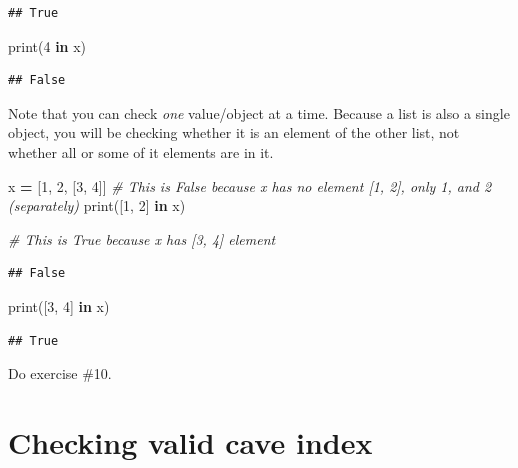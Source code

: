 \documentclass[
]{book}
\newenvironment{Shaded}{\begin{snugshade}}{\end{snugshade}}
\newcommand{\BuiltInTok}[1]{#1}
\newcommand{\CommentTok}[1]{\textcolor[rgb]{0.56,0.35,0.01}{\textit{#1}}}
\newcommand{\DecValTok}[1]{\textcolor[rgb]{0.00,0.00,0.81}{#1}}
\newcommand{\KeywordTok}[1]{\textcolor[rgb]{0.13,0.29,0.53}{\textbf{#1}}}
\newcommand{\NormalTok}[1]{#1}
\newcommand{\OperatorTok}[1]{\textcolor[rgb]{0.81,0.36,0.00}{\textbf{#1}}}
\begin{document}
\begin{verbatim}
## True
\end{verbatim}

\begin{Shaded}
\begin{Highlighting}[]
\BuiltInTok{print}\NormalTok{(}\DecValTok{4} \KeywordTok{in}\NormalTok{ x)}
\end{Highlighting}
\end{Shaded}

\begin{verbatim}
## False
\end{verbatim}

Note that you can check \emph{one} value/object at a time. Because a list is also a single object, you will be checking whether it is an element of the other list, not whether all or some of it elements are in it.

\begin{Shaded}
\begin{Highlighting}[]
\NormalTok{x }\OperatorTok{=}\NormalTok{ [}\DecValTok{1}\NormalTok{, }\DecValTok{2}\NormalTok{, [}\DecValTok{3}\NormalTok{, }\DecValTok{4}\NormalTok{]]}
\CommentTok{\# This is False because x has no element [1, 2], only 1, and 2 (separately)}
\BuiltInTok{print}\NormalTok{([}\DecValTok{1}\NormalTok{, }\DecValTok{2}\NormalTok{] }\KeywordTok{in}\NormalTok{ x)}

\CommentTok{\# This is True because x has [3, 4] element}
\end{Highlighting}
\end{Shaded}

\begin{verbatim}
## False
\end{verbatim}

\begin{Shaded}
\begin{Highlighting}[]
\BuiltInTok{print}\NormalTok{([}\DecValTok{3}\NormalTok{, }\DecValTok{4}\NormalTok{] }\KeywordTok{in}\NormalTok{ x)}
\end{Highlighting}
\end{Shaded}

\begin{verbatim}
## True
\end{verbatim}

Do exercise \#10.

\hypertarget{checking-valid-cave-index}{%
\section{Checking valid cave index}\label{checking-valid-cave-index}}
\end{document}
